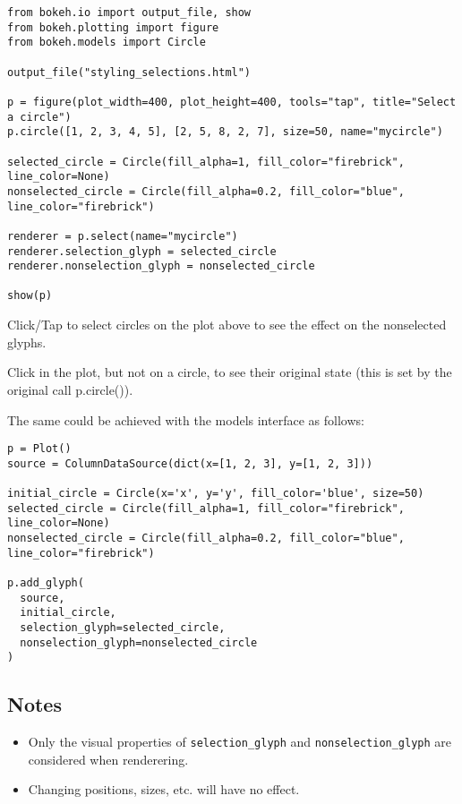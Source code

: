 \begin{framed}
	\begin{verbatim}
from bokeh.io import output_file, show
from bokeh.plotting import figure
from bokeh.models import Circle

output_file("styling_selections.html")

p = figure(plot_width=400, plot_height=400, tools="tap", title="Select a circle")
p.circle([1, 2, 3, 4, 5], [2, 5, 8, 2, 7], size=50, name="mycircle")

selected_circle = Circle(fill_alpha=1, fill_color="firebrick", line_color=None)
nonselected_circle = Circle(fill_alpha=0.2, fill_color="blue", line_color="firebrick")

renderer = p.select(name="mycircle")
renderer.selection_glyph = selected_circle
renderer.nonselection_glyph = nonselected_circle

show(p)

\end{verbatim}
\end{framed}

Click/Tap to select circles on the plot above to see the effect on the nonselected glyphs.

Click in the plot, but not on a circle, to see their original state (this is set by the original call p.circle()).

The same could be achieved with the models interface as follows:


\begin{framed}
	\begin{verbatim}p = Plot()
source = ColumnDataSource(dict(x=[1, 2, 3], y=[1, 2, 3]))

initial_circle = Circle(x='x', y='y', fill_color='blue', size=50)
selected_circle = Circle(fill_alpha=1, fill_color="firebrick", line_color=None)
nonselected_circle = Circle(fill_alpha=0.2, fill_color="blue", line_color="firebrick")

p.add_glyph(
  source,
  initial_circle,
  selection_glyph=selected_circle,
  nonselection_glyph=nonselected_circle
)
\end{verbatim}
\end{framed}
\subsection{Notes}
\begin{itemize}
\item Only the visual properties of \texttt{selection\_glyph} and \texttt{nonselection\_glyph} are considered when renderering. 
\item Changing positions, sizes, etc. will have no effect.
\end{itemize}




